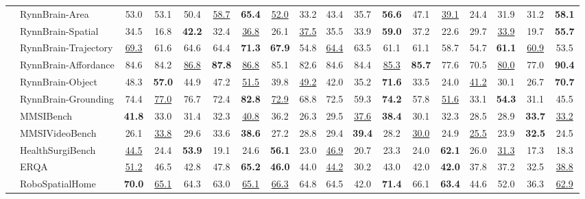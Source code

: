 \begin{table}[p]
\begin{adjustbox}{width=\textwidth}
\begin{tabular}{@{}c l|>{\columncolor{columnours}}ccccc|>{\columncolor{columnours}}cccccc|>{\columncolor{columnours}}ccccc@{}}
        & RynnBrain-Area & 53.0 & 53.1 & 50.4 & \underline{58.7} & \textbf{65.4} & \underline{52.0} & 33.2 & 43.4 & 35.7 & \textbf{56.6} & 47.1 & \underline{39.1} & 24.4 & 31.9 & 31.2 & \textbf{58.1} \\
        & RynnBrain-Spatial & 34.5 & 16.8 & \textbf{42.2} & 32.4 & \underline{36.8} & 26.1 & \underline{37.5} & 35.5 & 33.9 & \textbf{59.0} & 37.2 & 22.6 & 29.7 & \underline{33.9} & 19.7 & \textbf{55.7} \\
        & RynnBrain-Trajectory & \underline{69.3} & 61.6 & 64.6 & 64.4 & \textbf{71.3} & \textbf{67.9} & 54.8 & \underline{64.4} & 63.5 & 61.1 & 61.1 & 58.7 & 54.7 & \textbf{61.1} & \underline{60.9} & 53.5 \\
        & RynnBrain-Affordance & 84.6 & 84.2 & \underline{86.8} & \textbf{87.8} & \underline{86.8} & 85.1 & 82.6 & 84.6 & 84.4 & \underline{85.3} & \textbf{85.7} & 77.6 & 70.5 & \underline{80.0} & 77.0 & \textbf{90.4} \\
        & RynnBrain-Object & 48.3 & \textbf{57.0} & 44.9 & 47.2 & \underline{51.5} & 39.8 & \underline{49.2} & 42.0 & 35.2 & \textbf{71.6} & 33.5 & 24.0 & \underline{41.2} & 30.1 & 26.7 & \textbf{70.7} \\
        & RynnBrain-Grounding & 74.4 & \underline{77.0} & 76.7 & 72.4 & \textbf{82.8} & \underline{72.9} & 68.8 & 72.5 & 59.3 & \textbf{74.2} & 57.8 & \underline{51.6} & 33.1 & \textbf{54.3} & 31.1 & 45.5 \\
        & MMSIBench & \textbf{41.8} & 33.0 & 31.4 & 32.3 & \underline{40.8} & 36.2 & 26.3 & 29.5 & \underline{37.6} & \textbf{38.4} & 30.1 & 32.3 & 28.5 & 28.9 & \textbf{33.7} & \underline{33.2} \\
        & MMSIVideoBench & 26.1 & \underline{33.8} & 29.6 & 33.6 & \textbf{38.6} & 27.2 & 28.8 & 29.4 & \textbf{39.4} & 28.2 & \underline{30.0} & 24.9 & \underline{25.5} & 23.9 & \textbf{32.5} & 24.5 \\
        & HealthSurgiBench & \underline{44.5} & 24.4 & \textbf{53.9} & 19.1 & 24.6 & \textbf{56.1} & 23.0 & \underline{46.9} & 20.7 & 23.3 & 24.0 & \textbf{62.1} & 26.0 & \underline{31.3} & 17.3 & 18.3 \\
        & ERQA & \underline{51.2} & 46.5 & 42.8 & 47.8 & \textbf{65.2} & \textbf{46.0} & 44.0 & \underline{44.2} & 30.2 & 43.0 & 42.0 & \textbf{42.0} & 37.8 & 37.2 & 32.5 & \underline{38.8} \\
        & RoboSpatialHome & \textbf{70.0} & \underline{65.1} & 64.3 & 63.0 & \underline{65.1} & \underline{66.3} & 64.8 & 64.5 & 42.0 & \textbf{71.4} & 66.1 & \textbf{63.4} & 44.6 & 52.0 & 36.3 & \underline{62.9} \\

\end{tabular}
\end{adjustbox}
\end{table}
